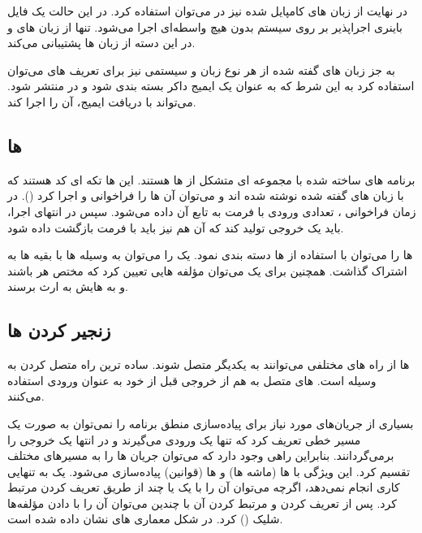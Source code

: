 در نهایت از زبان های کامپایل شده نیز در  می‌توان استفاده کرد. در این حالت یک فایل باینری اجراپذیر بر روی سیستم بدون هیچ واسطه‌ای اجرا می‌شود.  تنها از زبان های  و  در این دسته از زبان ها پشتیبانی می‌کند.

به جز زبان های گفته شده از هر نوع زبان و سیستمی نیز برای تعریف  های  می‌توان استفاده کرد به این شرط که به عنوان یک ایمیج داکر بسته بندی شود و در  منتشر شود.  می‌تواند با دریافت ایمیج، آن را اجرا کند.

\subsection{ ها}

برنامه های ساخته شده با  مجموعه ای متشکل از  ها هستند. این  ها تکه ای کد هستند که با زبان های گفته شده نوشته شده اند و می‌توان آن ها را فراخوانی و اجرا کرد (). در زمان فراخوانی ، تعدادی ورودی با فرمت  به تابع آن داده می‌شود. سپس در انتهای اجرا،  باید یک خروجی تولید کند که آن هم نیز باید با فرمت  بازگشت داده شود.

 ها را می‌توان با استفاده از  ها دسته بندی نمود. یک  را می‌توان به وسیله  ها با بقیه  ها به اشتراک گذاشت. همچنین برای یک  می‌توان مؤلفه هایی تعیین کرد که مختص هر  باشند و به  هایش به ارث برسند.

\subsection{زنجیر کردن  ها}

 ها از راه های مختلفی می‌توانند به یکدیگر متصل شوند. ساده ترین راه متصل کردن به وسیله  است.  های متصل به هم از خروجی  قبل از خود به عنوان ورودی استفاده می‌کنند.

بسیاری از جریان‌های مورد نیاز برای پیاده‌سازی منطق برنامه را نمی‌توان به صورت یک مسیر خطی تعریف کرد که تنها یک ورودی می‌گیرند و در انتها یک خروجی را برمی‌گردانند. بنابراین راهی وجود دارد که می‌توان جریان  ها را به مسیرهای مختلف تقسیم کرد. این ویژگی با  ها (ماشه ها) و  ها (قوانین) پیاده‌سازی می‌شود. یک  به تنهایی کاری انجام نمی‌دهد، اگرچه می‌توان آن را با یک یا چند  از طریق تعریف کردن  مرتبط کرد. پس از تعریف کردن  و مرتبط کردن آن با چندین  می‌توان آن را با دادن مؤلفه‌ها شلیک () کرد. در شکل معماری  های  نشان داده شده است.

